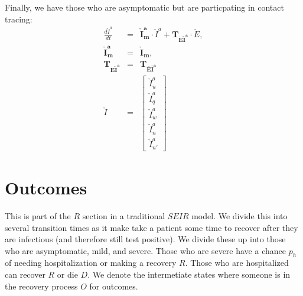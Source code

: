 \documentclass[notitlepage, superscriptaddress]{revtex4-2}
\begin{document}
Finally, we have those who are asymptomatic but are particpating in contact tracing:
\begin{eqnarray}
\frac{d\check{I}^{a}}{dt} &=& \boldsymbol{\check{I}^{a}_{m}} \cdot \check{I}^{a} + \boldsymbol{T_{\check{E}\check{I}^{a}}} \cdot  \check{E}, \\
\boldsymbol{\check{I}^{a}_{m}} &=& \boldsymbol{\check{I}_{m}}, \\ 
%
\boldsymbol{T_{\check{E}\check{I}^{a}}} &=& \boldsymbol{T_{\bar{E}\bar{I}^{a}}} \\
%
\check{I} &=& 
\begin{bmatrix}
\check{I}^{a}_{u} \\[.15cm] \check{I}^{a}_{q} \\[.15cm] \check{I}^{a}_{w}\\[.15cm] \check{I}^{a}_{n} \\[.15cm] \check{I}^{a}_{n'}
\end{bmatrix}
\end{eqnarray}


\section{Outcomes}
This is part of the $R$ section in a traditional $SEIR$ model. We divide this into several transition times as it make take a patient some time to recover after they are infectious (and therefore still test positive). We divide these up into those who are asymptomatic, mild, and severe. Those who are severe have a chance $p_h$ of needing hospitalization or making a recovery $R$. Those who are hospitalized can recover $R$ or die $D$. We denote the intermetiate states where someone is in the recovery process $O$ for outcomes.
\end{document}
